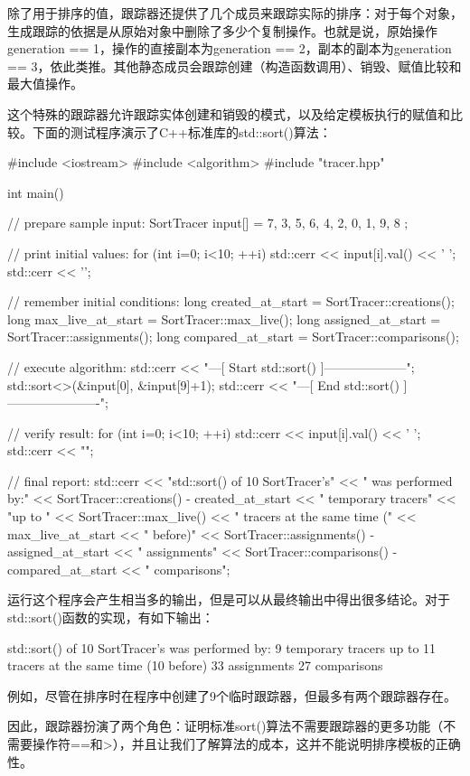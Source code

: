 除了用于排序的值，跟踪器还提供了几个成员来跟踪实际的排序：对于每个对象，生成跟踪的依据是从原始对象中删除了多少个复制操作。也就是说，原始操作generation == 1，操作的直接副本为generation == 2，副本的副本为generation == 3，依此类推。其他静态成员会跟踪创建（构造函数调用）、销毁、赋值比较和最大值操作。

这个特殊的跟踪器允许跟踪实体创建和销毁的模式，以及给定模板执行的赋值和比较。下面的测试程序演示了C++标准库的std::sort()算法：

\begin{cpp}
#include <iostream>
#include <algorithm>
#include "tracer.hpp"

int main()
{
	// prepare sample input:
	SortTracer input[] = { 7, 3, 5, 6, 4, 2, 0, 1, 9, 8 };
	
	// print initial values:
	for (int i=0; i<10; ++i) {
		std::cerr << input[i].val() << ' ';
	}
	std::cerr << '\n';
	
	// remember initial conditions:
	long created_at_start = SortTracer::creations();
	long max_live_at_start = SortTracer::max_live();
	long assigned_at_start = SortTracer::assignments();
	long compared_at_start = SortTracer::comparisons();
	
	// execute algorithm:
	std::cerr << "---[ Start std::sort() ]--------------------\n";
	std::sort<>(&input[0], &input[9]+1);
	std::cerr << "---[ End std::sort() ]----------------------\n";
	
	// verify result:
	for (int i=0; i<10; ++i) {
		std::cerr << input[i].val() << ' ';
	}
	std::cerr << "\n\n";
	
	// final report:
	std::cerr << "std::sort() of 10 SortTracer's"
			<< " was performed by:\n "
			<< SortTracer::creations() - created_at_start
			<< " temporary tracers\n "
			<< "up to "
			<< SortTracer::max_live()
			<< " tracers at the same time ("
			<< max_live_at_start << " before)\n "
			<< SortTracer::assignments() - assigned_at_start
			<< " assignments\n "
			<< SortTracer::comparisons() - compared_at_start
			<< " comparisons\n\n";
}
\end{cpp}

运行这个程序会产生相当多的输出，但是可以从最终输出中得出很多结论。对于std::sort()函数的实现，有如下输出：

\begin{shell}
std::sort() of 10 SortTracer's was performed by:
 9 temporary tracers
 up to 11 tracers at the same time (10 before)
 33 assignments
 27 comparisons
\end{shell}

例如，尽管在排序时在程序中创建了9个临时跟踪器，但最多有两个跟踪器存在。

因此，跟踪器扮演了两个角色：证明标准sort()算法不需要跟踪器的更多功能（不需要操作符==和>），并且让我们了解算法的成本，这并不能说明排序模板的正确性。




































